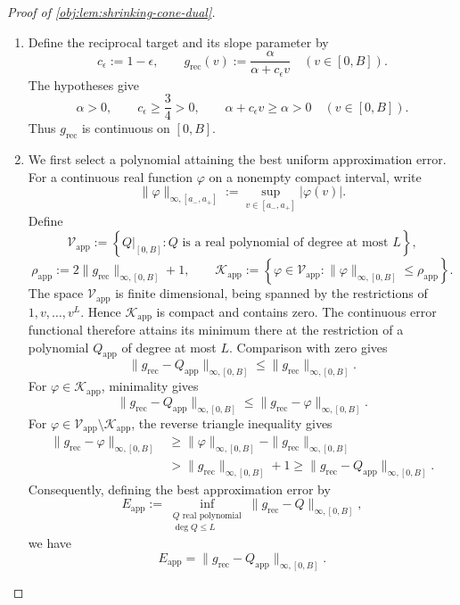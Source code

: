 \begin{proof}[Proof of \cref{obj:lem:shrinking-cone-dual}]
\begin{enumerate}
\item Define the reciprocal target and its slope parameter by
\[
c_\epsilon:=1-\epsilon,
\qquad
g_{\mathrm{rec}}(v):=\frac{\alpha}{\alpha+c_\epsilon v}
\quad (v\in[0,B]).
\]
The hypotheses give
\[
\alpha>0,
\qquad
c_\epsilon\ge\frac34>0,
\qquad
\alpha+c_\epsilon v\ge\alpha>0
\quad (v\in[0,B]).
\]
Thus \(g_{\mathrm{rec}}\) is continuous on \([0,B]\). %

\item We first select a polynomial attaining the best uniform approximation error. For a continuous real function \(\varphi\) on a nonempty compact interval, write
\[
\|\varphi\|_{\infty,[a_-,a_+]}
:=
\sup_{v\in[a_-,a_+]}|\varphi(v)|.
\]
Define
\[
\mathcal V_{\mathrm{app}}
:=
\left\{
Q|_{[0,B]}:
Q\text{ is a real polynomial of degree at most }L
\right\},
\]
\[
\rho_{\mathrm{app}}
:=
2\|g_{\mathrm{rec}}\|_{\infty,[0,B]}+1,
\qquad
\mathcal K_{\mathrm{app}}
:=
\left\{
\varphi\in\mathcal V_{\mathrm{app}}:
\|\varphi\|_{\infty,[0,B]}\le\rho_{\mathrm{app}}
\right\}.
\]
The space \(\mathcal V_{\mathrm{app}}\) is finite dimensional, being spanned by the restrictions of \(1,v,\ldots,v^L\). Hence \(\mathcal K_{\mathrm{app}}\) is compact and contains zero. The continuous error functional therefore attains its minimum there at the restriction of a polynomial \(Q_{\mathrm{app}}\) of degree at most \(L\). Comparison with zero gives
\[
\|g_{\mathrm{rec}}-Q_{\mathrm{app}}\|_{\infty,[0,B]}
\le
\|g_{\mathrm{rec}}\|_{\infty,[0,B]}.
\]
For \(\varphi\in\mathcal K_{\mathrm{app}}\), minimality gives
\[
\|g_{\mathrm{rec}}-Q_{\mathrm{app}}\|_{\infty,[0,B]}
\le
\|g_{\mathrm{rec}}-\varphi\|_{\infty,[0,B]}.
\]
For \(\varphi\in\mathcal V_{\mathrm{app}}\setminus\mathcal K_{\mathrm{app}}\), the reverse triangle inequality gives
\[
\begin{aligned}
\|g_{\mathrm{rec}}-\varphi\|_{\infty,[0,B]}
&\ge
\|\varphi\|_{\infty,[0,B]}
-\|g_{\mathrm{rec}}\|_{\infty,[0,B]}\\
&>
\|g_{\mathrm{rec}}\|_{\infty,[0,B]}+1
\ge
\|g_{\mathrm{rec}}-Q_{\mathrm{app}}\|_{\infty,[0,B]}.
\end{aligned}
\]
Consequently, defining the best approximation error by
\[
E_{\mathrm{app}}
:=
\inf_{\substack{Q\text{ real polynomial}\\ \deg Q\le L}}
\|g_{\mathrm{rec}}-Q\|_{\infty,[0,B]},
\]
we have
\[
E_{\mathrm{app}}
=
\|g_{\mathrm{rec}}-Q_{\mathrm{app}}\|_{\infty,[0,B]}.
\]


\end{enumerate}
\end{proof}
